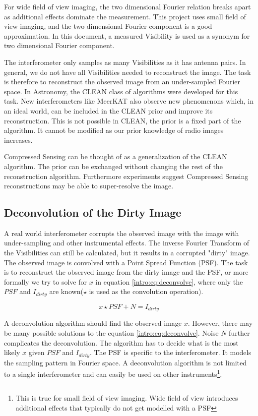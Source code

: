 For wide field of view imaging, the two dimensional Fourier relation breaks apart as additional effects dominate the measurement. This project uses small field of view imaging, and the two dimensional Fourier component is a good approximation. In this document, a measured Visibility is used as a synonym for two dimensional Fourier component.

The interferometer only samples as many Visibilities as it has antenna pairs. In general, we do not have all Visibilities needed to reconstruct the image. The task is therefore to reconstruct the observed image from an under-sampled Fourier space. In Astronomy, the CLEAN class of algorithms\cite{hogbom1974aperture}\cite{schwab1984relaxing}\cite{rich2008multi}\cite{rau2011multi} were developed for this task. New interferometers like MeerKAT also observe new phenomenons which, in an ideal world, can be included in the CLEAN prior and improve its reconstruction. This is not possible in CLEAN, the prior is a fixed part of the algorithm. It cannot be modified as our prior knowledge of radio images increases.

Compressed Sensing can be thought of as a generalization of the CLEAN algorithm. The prior can be exchanged without changing the rest of the reconstruction algorithm. Furthermore experiments suggest Compressed Sensing reconstructions may be able to super-resolve the image\cite{girard2015sparse}.


\subsection{Deconvolution of the Dirty Image}
A real world interferometer corrupts the observed image with the image with under-sampling and other instrumental effects. The inverse Fourier Transform of the Visibilities can still be calculated, but it results in a corrupted "dirty" image. The observed image is convolved with a Point Spread Function (PSF). The task is to reconstruct the observed image from the dirty image and the PSF, or more formally we try to solve for $x$ in equation \eqref{intro:eq:deconvolve}, where only the $PSF$ and $I_{dirty}$ are known($\star$ is used as the convolution operation).

\begin{equation}\label{intro:eq:deconvolve}
x \star  PSF + N = I_{dirty} 
\end{equation}

A deconvolution algorithm should find the observed image $x$. However, there may be many possible solutions to the equation \eqref{intro:eq:deconvolve}. Noise $N$ further complicates the deconvolution. The algorithm has to decide what is the most likely $x$ given $PSF$ and $I_{dirty}$. The PSF is specific to the interferometer. It models the sampling pattern in Fourier space. A deconvolution algorithm is not limited to a single interferometer and can easily be used on other instruments\footnote{This is true for small field of view imaging. Wide field of view introduces additional effects that typically do not get modelled with a PSF}.

